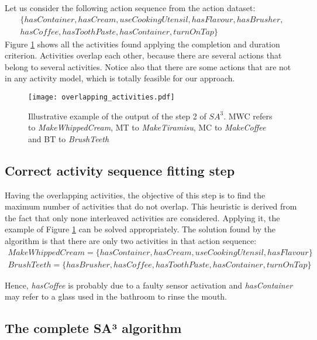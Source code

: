 Let us consider the following action sequence from the action dataset:
\begin{equation*}
\begin{split}
 \{hasContainer, hasCream, useCookingUtensil, hasFlavour, hasBrusher, \\ 
 hasCoffee, hasToothPaste, hasContainer, turnOnTap\}
\end{split}  
\end{equation*}
Figure \ref{fig:overlap} shows all the activities found applying the completion and duration criterion. Activities overlap each other, because there are several actions that belong to several activities. Notice also that there are some actions that are not in any activity model, which is totally feasible for our approach.
\begin{figure}[htbp]
\centering
\texttt{[image: overlapping\_activities.pdf]}
    \caption{Illustrative example of the output of the step 2 of $SA^3$. MWC refers to \textit{MakeWhippedCream}, MT to \textit{MakeTiramisu}, MC to \textit{MakeCoffee} and BT to \textit{BrushTeeth}}
    \label{fig:overlap}
\end{figure}

\subsection{Correct activity sequence fitting step}
\label{subsec:clustering:sa3:fit}
Having the overlapping activities, the objective of this step is to find the maximum number of activities that do not overlap. This heuristic is derived from the fact that only none interleaved activities are considered. Applying it, the example of Figure \ref{fig:overlap} can be solved appropriately. The solution found by the algorithm is that there are only two activities in that action sequence:
\begin{equation*}
  \begin{split}   
  MakeWhippedCream = \{hasContainer, hasCream, useCookingUtensil, hasFlavour\} \\
  BrushTeeth = \{hasBrusher, hasCoffee, hasToothPaste, hasContainer, turnOnTap\} 
  \end{split}
 \end{equation*}  

Hence, \textit{hasCoffee} is probably due to a faulty sensor activation and \textit{hasContainer} may refer to a glass used in the bathroom to rinse the mouth. 

\subsection{The complete SA³ algorithm}



